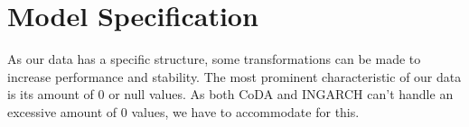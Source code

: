 \section{Model Specification}
\label{sec: Model Specification}

As our data has a specific structure, some transformations can be made to increase performance and stability. The most prominent characteristic of our data is its amount of 0 or null values. As both CoDA and INGARCH can't handle an excessive amount of 0 values, we have to accommodate for this. 